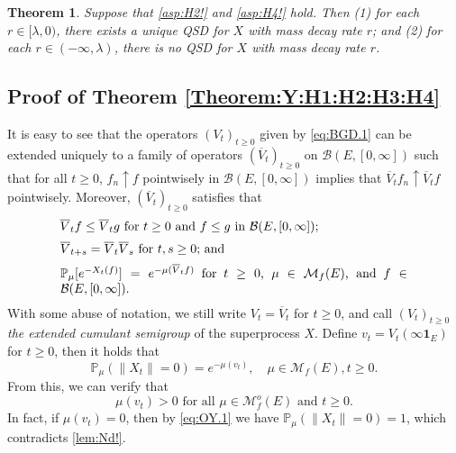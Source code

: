 \documentclass[12pt,a4paper]{amsart}
\numberwithin{equation}{section}
\theoremstyle{plain}
\newtheorem{thm}{Theorem}[section]
\theoremstyle{definition}
\theoremstyle{remark}
\begin{document}
\begin{thm} \label{thm:QSD}
	Suppose that \eqref{asp:H2!} and \eqref{asp:H4!} hold.
	Then (1) for each $r \in [\lambda, 0)$, there exists a unique QSD for $X$ with mass decay rate $r$;
	and (2) for each $r\in (-\infty, \lambda)$, there is no QSD for $X$ with mass decay rate $r$.
\end{thm}

\subsection{Proof of Theorem \ref{Theorem:Y:H1:H2:H3:H4}} \label{subsec:OY}
	It is easy to see that the operators $(V_t)_{t\geq 0}$
	given by \eqref{eq:BGD.1} can be extended uniquely to a family of operators $(\overline V_t)_{t\geq 0}$ on $\mathcal B(E,[0,\infty])$ such that for all $t\geq 0$, $f_n \uparrow f$ pointwisely in  $\mathcal B(E, [0,\infty])$ implies that $\overline V_tf_n \uparrow \overline V_tf$ pointwisely.
	Moreover, $(\overline V_t)_{t\geq 0}$ satisfies that
\begin{equation}
\begin{minipage}{0.8\textwidth}
	$\overline V_t f \leq \overline V_t g$ for $t\geq 0$ and $f\leq g$ in $\mathcal B(E,[0,\infty])$;
\end{minipage}\label{Fact:BV!}
\end{equation}
\begin{equation}
\begin{minipage}{0.8\textwidth}
	$\overline V_{t+s} = \overline V_t \overline V_s$ for $t, s\geq 0$;  and
\end{minipage} \label{eq:OY.0}
\end{equation}
\begin{equation}
\begin{minipage}{0.8\textwidth}
	$\mathbb P_\mu [e^{-X_t(f)}] = e^{- \mu(\overline V_tf)}$ for $t\geq 0$, $\mu \in \mathcal M_f(E)$, and $f\in \mathcal B(E,[0,\infty])$.
\end{minipage} \label{eq:BGD.2}
\end{equation}
	With some abuse of notation, we still write $V_t = \overline V_t$ for $t\geq 0$, and call $(V_t)_{t\geq 0}$ \emph{the extended cumulant semigroup} of the superprocess $X$.
	Define $v_t = V_t(\infty  \mathbf 1_E)$ for $t\geq 0$, then it holds that
\begin{equation} \label{eq:OY.1}
	\mathbb P_\mu (\|X_t\| = 0)
	= e^{- \mu (v_t)},
	\quad \mu \in \mathcal M_f(E), t\geq 0.
\end{equation}
	From this, we can verify that
\begin{equation}\label{lem:sv2!}
	\text{$\mu(v_t) > 0$ for all $\mu \in \mathcal M_f^o(E)$ and $t \geq 0$.}
\end{equation}
	In fact, if $\mu(v_t) = 0$, then by \eqref{eq:OY.1} we have $\mathbb P_\mu(\|X_t \| = 0) = 1$, which contradicts \eqref{lem:Nd!}.
\end{document}
